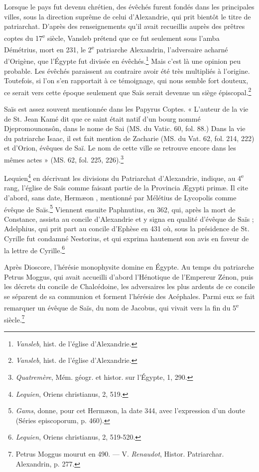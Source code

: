 \documentclass[letterpaper,twocolumn,openany,nodeprecatedcode]{dndbook}
\begin{document}
Lorsque le pays fut devenu chrétien, des évêchés furent fondés dans les principales villes, sous la direction suprême de celui d'Alexandrie, qui prit bientôt le titre de patriarchat. D'après des renseignements qu'il avait recueillis auprès des prêtres coptes du 17\textsuperscript{e} siècle, Vansleb prétend que ce fut seulement sous l'amba Démétrius, mort en 231, le 2\textsuperscript{e} patriarche Alexandrin, l'adversaire acharné d'Origène, que l'Égypte fut divisée en évêchés.\footnote{\emph{Vansleb}, hist. de l'église d'Alexandrie.} Mais c'est là une opinion peu probable. Les évêchés paraissent au contraire avoir été très multipliés à l'origine. Toutefois, si l'on s'en rapportait à ce témoignage, qui nous semble fort douteux, ce serait vers cette époque seulement que Saïs serait devenue un siège épiscopal.\footnote{\emph{Vansleb}, hist. de l'église d'Alexandrie.}

Saïs est assez souvent mentionnée dans les Papyrus Coptes. « L'auteur de la vie de St. Jean Kamé dit que ce saint était natif d'un bourg nommé Djepromounonsôn, dans le nome de Sai (MS. du Vatic. 60, fol. 88.) Dans la vie du patriarche Isaac, il est fait mention de Zacharie (MS. du Vat. 62, fol. 214, 222) et d'Orion, évêques de Saï. Le nom de cette ville se retrouve encore dans les mêmes actes » (MS. 62, fol. 225, 226).\footnote{\emph{Quatremère}, Mém. géogr. et histor. sur l'Égypte, 1, 290.}

Lequien\footnote{\emph{Lequien}, Oriens christianus, 2, 519.} en décrivant les divisions du Patriarchat d'Alexandrie, indique, au 4\textsuperscript{e} rang, l'église de Saïs comme faisant partie de la Provincia Ægypti primæ. Il cite d'abord, sans date, Hermæon , mentionné par Mélétius de Lycopolis comme évêque de Saïs.\footnote{\emph{Gams}, donne, pour cet Hermæon, la date 344, avec l'expression d'un doute (Séries episcoporum, p. 460).} Viennent ensuite Paphnutius, en 362, qui, après la mort de Constance, assista au concile d'Alexandrie et y signa en qualité d'évêque de Saïs ; Adelphius, qui prit part au concile d'Ephèse en 431 où, sous la présidence de St. Cyrille fut condamné Nestorius, et qui exprima hautement son avis en faveur de la lettre de Cyrille.\footnote{\emph{Lequien}, Oriens christianus, 2, 519-520.}

Après Dioscore, l'hérésie monophysite domine en Égypte. Au temps du patriarche Petrus Moggus, qui avait accueilli d'abord l'Hénotique de l'Empereur Zénon, puis les décrets du concile de Chalcédoine, les adversaires les plus ardents de ce concile se séparent de sa communion et forment l'hérésie des Acéphales. Parmi eux se fait remarquer un évêque de Saïs, du nom de Jacobus, qui vivait vers la fin du 5\textsuperscript{e} siècle.\footnote{Petrus Moggus mourut en 490. --- V. \emph{Renaudot}, Histor. Patriarchar. Alexandrin, p. 277.}
\end{document}
